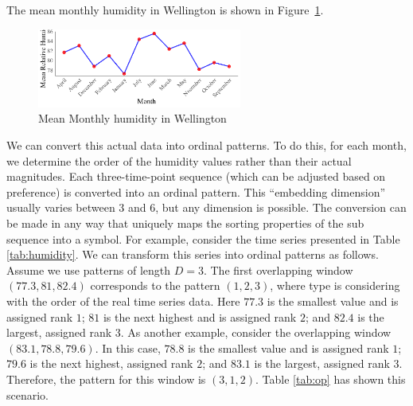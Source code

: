 The mean monthly humidity in Wellington is shown in Figure~\ref{fig:humidity}.

\begin{figure}[hbt]
	\centering
	\includegraphics[width=0.6\textwidth]{humidity graph}
	\caption{Mean Monthly humidity in Wellington}
	\label{fig:humidity}
\end{figure}

We can convert this actual data into ordinal patterns. 
To do this, for each month, we determine the order of the humidity values rather than their actual magnitudes. 
Each three-time-point sequence (which can be adjusted based on preference) is converted into an ordinal pattern.
This ``embedding dimension'' usually varies between $3$ and $6$, but any dimension is possible.
The conversion can be made in any way that uniquely maps the sorting properties of the sub sequence into a symbol.
For example, consider the time series presented in Table \ref{tab:humidity}. We can transform this series into ordinal patterns as follows. 
Assume we use patterns of length $D=3$. 
The first overlapping window $(77.3,81,82.4)$ corresponds to the pattern  $(1,2,3)$, where type is considering with the order of the real time series data. Here $77.3$ is the smallest value and is assigned rank $1$; $81$ is the next highest and is assigned rank $2$; and $82.4$ is the largest, assigned rank $3$. As another example, consider the overlapping window $(83.1, 78.8, 79.6)$.  In this case, $78.8$ is the smallest value and is assigned rank $1$; $79.6$ is the next highest, assigned rank $2$; and $83.1$ is the largest, assigned rank $3$. Therefore, the pattern for this window is $(3,1,2)$.
Table \ref{tab:op} has shown this scenario. 


